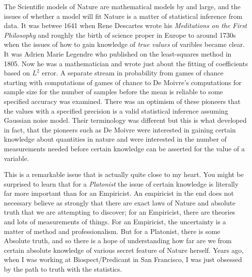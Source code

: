 \documentclass{amsart}
\begin{document}
The Scientific models of Nature are mathematical models by and large, and the issues of whether a model will fit Nature is a matter of statistical inference from data.  It was betwee 1641 when Rene Descartes wrote his {\em Meditations on the First Philosophy} and roughly the birth of science proper in Europe to around 1730s when the issues of how to gain knowledge of {\em true values} of varibles became clear.  It was Adrien Marie Legendre who published on the least-squares method in 1805.  Now he was a mathematician and wrote just about the fitting of coefficients based on $L^2$ error.  A separate stream in probability from games of chance starting with computations of games of chance to De Moivre's computations for sample size for the number of samples before the mean is reliable to some specified accuracy was examined.  There was an optimism of these pioneers that the values with a specified precision is a valid statistical inference assuming Gaussian noise model.  Their terminology was different but this is what developed in fact, that the pioneers such as De Moivre were interested in gaining certain knowledge about quantities in nature and were interested in the number of measurements needed before certain knowledge can be asserted for the value of a variable.  

This is a remarkable issue that is actually quite close to my heart.  You might be surprised to learn that for a {\em Platonist} the issue of certain knowledge is literally far more important than for an Empiricist.  An empiricist in the end does not necessary believe as strongly that there are exact laws of Nature and absolute truth that we are attempting to discover; for an Empiricist, there are theories and lots of measurements of things.  For an Empiricist, the uncertainty is a matter of method and professionalism.  But for a Platonist, there is some Absolute truth, and so there is a hope of understanding how far are we from certain absolute knowledge of various secret feature of Nature herself.  Years ago, when I was working at Biospect/Predicant in San Francisco, I was just obsessed by the path to truth with the statistics.  
\end{document}
